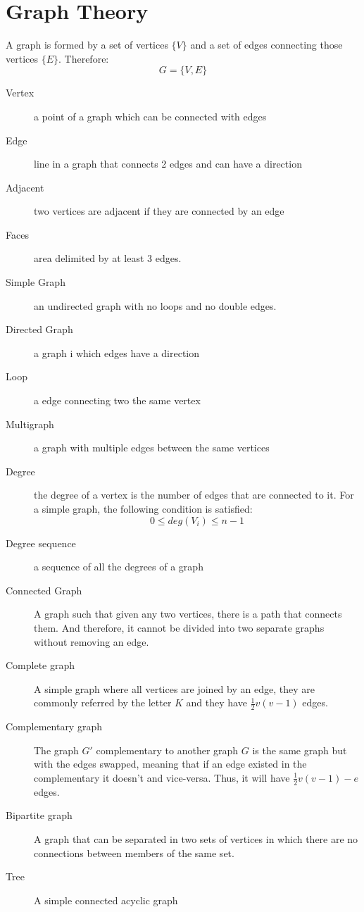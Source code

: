 \documentclass[11pt,twoside]{article}
\theoremstyle{defi}
\begin{document}
\section{Graph Theory}
\begin{definitionii}
A graph is formed by a set of vertices $\{V\}$ and a set of edges connecting those vertices $\{E\}$. Therefore:
$$G = \{V,E\}$$
\end{definitionii}
\begin{description}
\item[Vertex] a point of a graph which can be connected with edges
\item[Edge] line in a graph that connects 2 edges and can have a direction
\item[Adjacent] two vertices are adjacent if they are connected by an edge
\item[Faces] area delimited by at least 3 edges.
\item[Simple Graph] an undirected graph with no loops and no double edges.
\item[Directed Graph] a graph i which edges have a direction
\item[Loop] a edge connecting two the same vertex
\item[Multigraph] a graph with multiple edges between the same vertices
\item[Degree] the degree of a vertex is the number of edges that are connected to it. For a simple graph, the following condition is satisfied:
$$0\leq deg(V_i) \leq n-1$$
\item[Degree sequence] a sequence of all the degrees of a graph
\item[Connected Graph] A graph such that given any two vertices, there is a path that connects them. And therefore, it cannot be divided into two separate graphs without removing an edge.
\item[Complete graph] A simple graph where all vertices are joined by an edge, they are commonly referred by the letter $K$ and they have $\frac{1}{2}v(v-1)$ edges.
\item[Complementary graph] The graph $G'$ complementary to another graph $G$ is the same graph but with the edges swapped, meaning that if an edge existed in the complementary it doesn't and vice-versa. Thus, it will have $\frac{1}{2}v(v-1) - e$ edges.
\item[Bipartite graph] A graph that can be separated in two sets of vertices in which there are no connections between members of the same set.
\item[Tree] A simple connected acyclic graph

\end{description}
\end{document}
